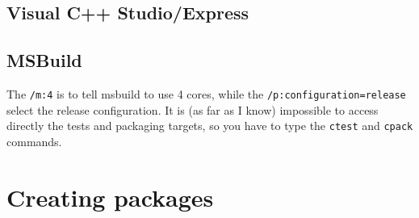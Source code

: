 \subsection{Visual C++ Studio/Express}

\subsection{MSBuild}
\label{sub:msbuild_build}
The \lstinline|/m:4| is to tell msbuild to use 4 cores, while the \lstinline|/p:configuration=release| select the release configuration. It is (as far as I know) impossible to access directly the tests and packaging targets, so you have to type the \lstinline|ctest| and \lstinline|cpack| commands. 


\section{Creating packages}